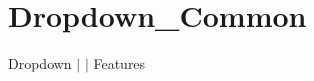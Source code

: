 \chapter{Dropdown\+\_\+\+Common }
\hypertarget{md__docs_2_common_2_features_2_dropdown___common}{}\label{md__docs_2_common_2_features_2_dropdown___common}
Dropdown \texorpdfstring{$\vert$}{|}  \texorpdfstring{$\vert$}{|} Features



 